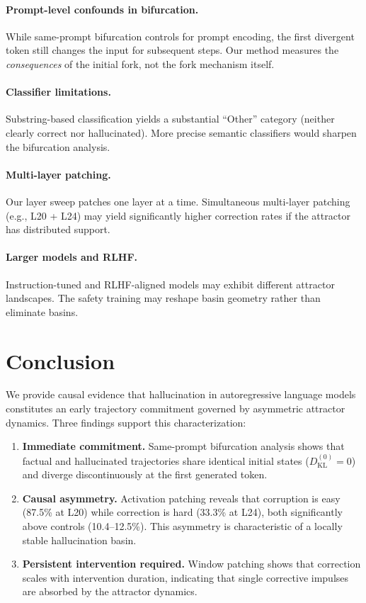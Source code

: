 \documentclass[11pt,a4paper]{article}
\begin{document}
\paragraph{Prompt-level confounds in bifurcation.} While same-prompt bifurcation controls for prompt encoding, the first divergent token still changes the input for subsequent steps. Our method measures the \emph{consequences} of the initial fork, not the fork mechanism itself.

\paragraph{Classifier limitations.} Substring-based classification yields a substantial ``Other'' category (neither clearly correct nor hallucinated). More precise semantic classifiers would sharpen the bifurcation analysis.

\paragraph{Multi-layer patching.} Our layer sweep patches one layer at a time. Simultaneous multi-layer patching (e.g., L20 + L24) may yield significantly higher correction rates if the attractor has distributed support.

\paragraph{Larger models and RLHF.} Instruction-tuned and RLHF-aligned models may exhibit different attractor landscapes. The safety training may reshape basin geometry rather than eliminate basins.

\section{Conclusion}

We provide causal evidence that hallucination in autoregressive language models constitutes an early trajectory commitment governed by asymmetric attractor dynamics. Three findings support this characterization:

\begin{enumerate}
    \item \textbf{Immediate commitment.} Same-prompt bifurcation analysis shows that factual and hallucinated trajectories share identical initial states ($D_\text{KL}^{(0)} = 0$) and diverge discontinuously at the first generated token.
    \item \textbf{Causal asymmetry.} Activation patching reveals that corruption is easy (87.5\% at L20) while correction is hard (33.3\% at L24), both significantly above controls (10.4--12.5\%). This asymmetry is characteristic of a locally stable hallucination basin.
    \item \textbf{Persistent intervention required.} Window patching shows that correction scales with intervention duration, indicating that single corrective impulses are absorbed by the attractor dynamics.
\end{enumerate}
\end{document}
